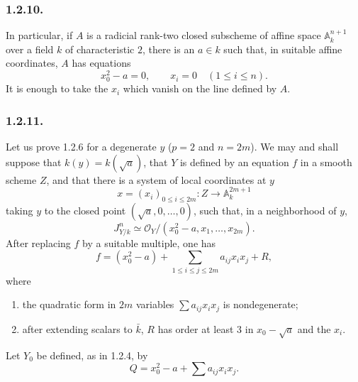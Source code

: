 \subsubsection*{1.2.10.}
In particular, if $A$ is a radicial rank-two closed subscheme of
affine space $\mathbb A_k^{n+1}$ over a field $k$ of characteristic
$2$, there is an $a\in k$ such that, in suitable affine coordinates,
$A$ has equations
\[
x_0^2-a=0,
\qquad x_i=0\quad(1\leq i\leq n).
\]
It is enough to take the $x_i$ which vanish on the line defined by
$A$.

\subsubsection*{1.2.11.}
Let us prove 1.2.6 for a degenerate $y$ ($p=2$ and $n=2m$).  We may
and shall suppose that $k(y)=k(\sqrt a)$, that $Y$ is defined by an
equation $f$ in a smooth scheme $Z$, and that there is a system of
local coordinates at $y$
\[
x=(x_i)_{0\leq i\leq2m}:
Z\longrightarrow\mathbb A_k^{2m+1}
\]
taking $y$ to the closed point $(\sqrt a,0,\ldots,0)$, such that, in
a neighborhood of $y$,
\[
J^n_{Y/k}\simeq
\mathcal O_Y/(x_0^2-a,x_1,\ldots,x_{2m}).
\]
After replacing $f$ by a suitable multiple, one has
\[
f=(x_0^2-a)+
 \sum_{1\leq i\leq j\leq2m}a_{ij}x_ix_j+R,
\]
where
\begin{enumerate}[label=(\alph*),leftmargin=2.6em]
\item the quadratic form in $2m$ variables
$\sum a_{ij}x_ix_j$ is nondegenerate;
\item after extending scalars to $\bar k$, $R$ has order at least
$3$ in $x_0-\sqrt a$ and the $x_i$.
\end{enumerate}
Let $Y_0$ be defined, as in 1.2.4, by
\[
Q=x_0^2-a+\sum a_{ij}x_ix_j.
\]

